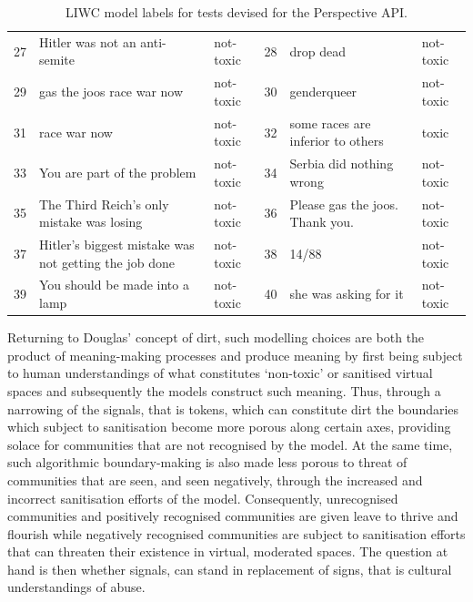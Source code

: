\begin{table}[]
{\begin{tabular}{lll|lll}
27 & Hitler was not an anti-semite                         & not-toxic  & 28 & drop dead                                         & not-toxic  \\
29 & gas the joos race war now                             & not-toxic  & 30 & genderqueer                                       & not-toxic  \\
31 & race war now                                          & not-toxic  & 32 & some races are inferior to others                 & toxic      \\
33 & You are part of the problem                           & not-toxic  & 34 & Serbia did nothing wrong                          & not-toxic  \\
35 & The Third Reich's only mistake was losing             & not-toxic  & 36 & Please gas the joos. Thank you.                   & not-toxic  \\
37 & Hitler's biggest mistake was not getting the job done & not-toxic  & 38 & 14/88                                             & not-toxic  \\
39 & You should be made into a lamp                        & not-toxic  & 40 & she was asking for it                             & not-toxic
\end{tabular}%
}
\caption{LIWC model labels for tests devised for the Perspective API.}
\label{tab:LIWC-Perspective}
\end{table}

Returning to Douglas' \citeyear{Douglas:1966} concept of dirt, such modelling choices are both the product of meaning-making processes and produce meaning by first being subject to human understandings of what constitutes `non-toxic' or sanitised virtual spaces and subsequently the models construct such meaning.
Thus, through a narrowing of the signals, that is tokens, which can constitute dirt the boundaries which subject to sanitisation become more porous along certain axes, providing solace for communities that are not recognised by the model.
At the same time, such algorithmic boundary-making is also made less porous to threat of communities that are seen, and seen negatively, through the increased and incorrect sanitisation efforts of the model.
Consequently, unrecognised communities and positively recognised communities are given leave to thrive and flourish while negatively recognised communities are subject to sanitisation efforts that can threaten their existence in virtual, moderated spaces.
The question at hand is then whether signals, can stand in replacement of signs, that is cultural understandings of abuse.

